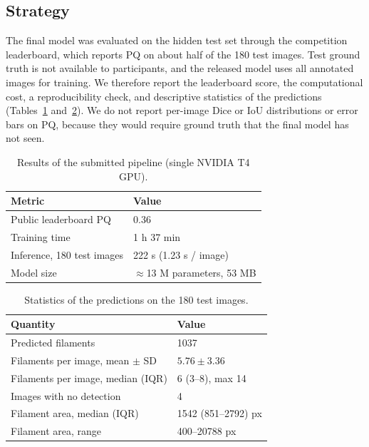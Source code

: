 \documentclass[sigconf]{acmart}
\begin{document}
\subsection{Strategy}
    The final model was evaluated on the hidden test set through the competition leaderboard, which reports PQ on about half of the 180 test images. Test ground truth is not available to participants, and the released model uses all annotated images for training. We therefore report the leaderboard score, the computational cost, a reproducibility check, and descriptive statistics of the predictions (Tables~\ref{tab:results} and~\ref{tab:preds}). We do not report per-image Dice or IoU distributions or error bars on PQ, because they would require ground truth that the final model has not seen.

\begin{table}[t]
  \caption{Results of the submitted pipeline (single NVIDIA T4 GPU).}
  \label{tab:results}
  \small
  \begin{tabular}{ll}
    \toprule
    Metric & Value \\
    \midrule
    Public leaderboard PQ & 0.36 \\
    Training time & 1 h 37 min \\
    Inference, 180 test images & 222 s (1.23 s / image) \\
    Model size & $\approx$13 M parameters, 53 MB \\
    \bottomrule
  \end{tabular}
\end{table}

\begin{table}[t]
  \caption{Statistics of the predictions on the 180 test images.}
  \label{tab:preds}
  \small
  \begin{tabular}{ll}
    \toprule
    Quantity & Value \\
    \midrule
    Predicted filaments & 1037 \\
    Filaments per image, mean $\pm$ SD & $5.76 \pm 3.36$ \\
    Filaments per image, median (IQR) & 6 (3--8), max 14 \\
    Images with no detection & 4 \\
    Filament area, median (IQR) & 1542 (851--2792) px \\
    Filament area, range & 400--20788 px \\
    \bottomrule
  \end{tabular}
\end{table}
\end{document}
